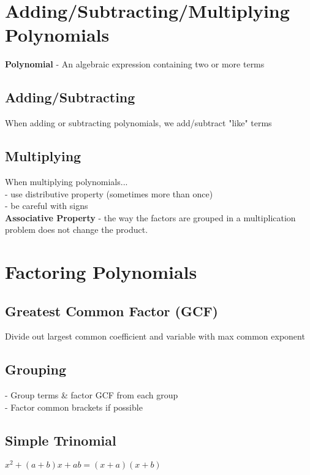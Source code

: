 \documentclass{article}
\begin{document}

\section{Adding/Subtracting/Multiplying Polynomials}

\textbf{Polynomial} - An algebraic expression containing two or more terms

\subsection*{Adding/Subtracting}
When adding or subtracting polynomials, we add/subtract "like" terms

\subsection*{Multiplying}
When multiplying polynomials...\\
- use distributive property (sometimes more than once) \\
- be careful with signs\\

\noindent
\textbf{Associative Property} - the way the factors are grouped in a multiplication problem does not change the product.



\section{Factoring Polynomials}

\subsection*{Greatest Common Factor (GCF)}
Divide out largest common coefficient and variable with max common exponent 

\subsection*{Grouping}
- Group terms & factor GCF from each group\\
- Factor common brackets if possible 

\subsection*{Simple Trinomial}
$x^2+(a+b)x+ab = (x+a)(x+b)$
\end{document}
